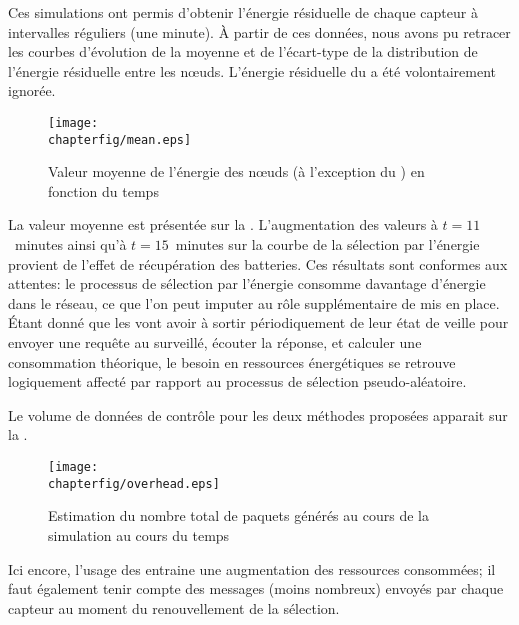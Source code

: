 Ces simulations ont permis d'obtenir l'énergie résiduelle de chaque capteur à intervalles réguliers (une minute).
À partir de ces données, nous avons pu retracer les courbes d'évolution de la moyenne et de l'écart-type de la distribution de l'énergie résiduelle entre les nœuds.
L'énergie résiduelle du \ch a été volontairement ignorée.
\begin{figure}[!ht]
    \centering
    \texttt{[image: \\chapterfig/mean.eps]}
    \caption{Valeur moyenne de l'énergie des nœuds (à l'exception du \ch) en fonction du temps}\label{se:fig:mean}
\end{figure}
La valeur moyenne est présentée sur la .
L'augmentation des valeurs à $t=11$~minutes ainsi qu'à $t=15$~minutes sur la courbe de la sélection par l'énergie provient de l'effet de récupération des batteries.
Ces résultats sont conformes aux attentes: le processus de sélection par l'énergie consomme davantage d'énergie dans le réseau, ce que l'on peut imputer au rôle supplémentaire de \vn mis en place.
Étant donné que les \vns vont avoir à sortir périodiquement de leur état de veille pour envoyer une requête au \cn surveillé, écouter la réponse, et calculer une consommation théorique, le besoin en ressources énergétiques se retrouve logiquement affecté par rapport au processus de sélection pseudo-aléatoire.

Le volume de données de contrôle pour les deux méthodes proposées apparait sur la .
\begin{figure}[!ht]
    \centering
    \texttt{[image: \\chapterfig/overhead.eps]}
    \caption{Estimation du nombre total de paquets générés au cours de la simulation au cours du temps}\label{se:fig:overhead}
\end{figure}
Ici encore, l'usage des \vns entraine une augmentation des ressources consommées; il faut également tenir compte des messages (moins nombreux) envoyés par chaque capteur au moment du renouvellement de la sélection.

